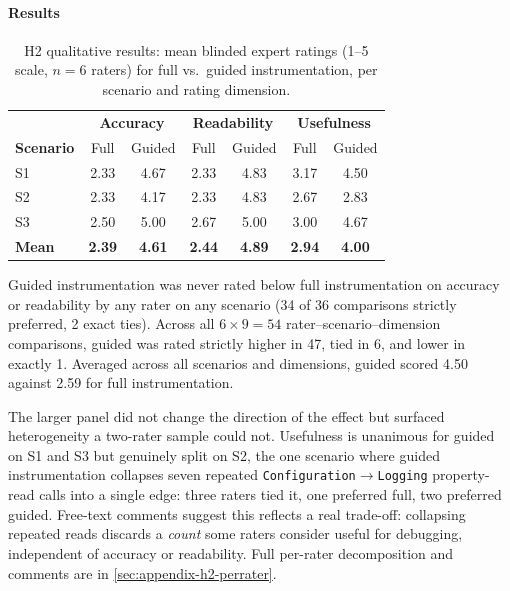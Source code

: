 \paragraph{Results}

\begin{table}[htb]
\centering
\caption{H2 qualitative results: mean blinded expert ratings (1--5 scale,
  $n=6$ raters) for full vs.\ guided instrumentation, per scenario and
  rating dimension.}
\label{tab:h2-qual-results}
\begin{tabular}{@{} l cc cc cc @{}}
\toprule
 & \multicolumn{2}{c}{\textbf{Accuracy}} & \multicolumn{2}{c}{\textbf{Readability}} & \multicolumn{2}{c}{\textbf{Usefulness}} \\
\textbf{Scenario} & Full & Guided & Full & Guided & Full & Guided \\
\midrule
S1 & 2.33 & 4.67 & 2.33 & 4.83 & 3.17 & 4.50 \\
S2 & 2.33 & 4.17 & 2.33 & 4.83 & 2.67 & 2.83 \\
S3 & 2.50 & 5.00 & 2.67 & 5.00 & 3.00 & 4.67 \\
\midrule
\textbf{Mean} & \textbf{2.39} & \textbf{4.61} & \textbf{2.44} & \textbf{4.89} & \textbf{2.94} & \textbf{4.00} \\
\bottomrule
\end{tabular}
\end{table}

Guided instrumentation was never rated below full instrumentation on
accuracy or readability by any rater on any scenario (34 of 36
comparisons strictly preferred, 2 exact ties). Across all
$6 \times 9 = 54$ rater--scenario--dimension comparisons, guided was
rated strictly higher in 47, tied in 6, and lower in exactly 1. Averaged
across all scenarios and dimensions, guided scored 4.50 against 2.59 for
full instrumentation.

The larger panel did not change the direction of the effect but
surfaced heterogeneity a two-rater sample could not. Usefulness is
unanimous for guided on S1 and S3 but genuinely split on S2, the one
scenario where guided instrumentation collapses seven repeated
\texttt{Configuration}$\to$\texttt{Logging} property-read calls into a
single edge: three raters tied it, one preferred full, two preferred
guided. Free-text comments suggest this reflects a real trade-off:
collapsing repeated reads discards a \emph{count} some raters consider
useful for debugging, independent of accuracy or readability. Full
per-rater decomposition and comments are in
\cref{sec:appendix-h2-perrater}.


